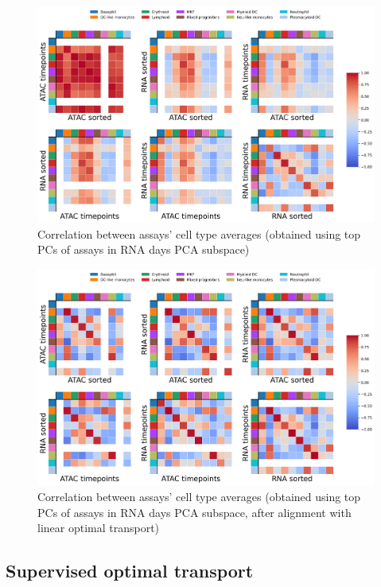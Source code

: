 \documentclass[a4paper]{article}
\begin{document}
\begin{figure}[!htb]
  \centering
  \includegraphics[width=\textwidth]{../figures/hematopoiesis/assays_X_pca_target_leiden_identity_simple2.png}
  \caption{Correlation between assays' cell type averages (obtained using top PCs of assays in RNA days PCA subspace)}
\end{figure}

\begin{figure}[!htb]
  \centering
  \includegraphics[width=\textwidth]{../figures/hematopoiesis/assays_X_pca_transp_leiden_identity_simple2.png}
  \caption{Correlation between assays' cell type averages (obtained using top PCs of assays in RNA days PCA subspace, after alignment with linear optimal transport)}
\end{figure}

\FloatBarrier
\subsection{Supervised optimal transport}
\end{document}
